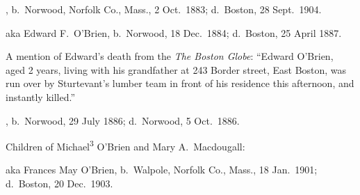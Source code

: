 \begin{Kids}
	
	, b.\ Norwood, Norfolk Co., Mass., 2 Oct.\ 1883;\cite{Arthur4OBrienBirth} d.\ Boston, 28 Sept.\ 1904.\cite{Arthur4OBrienDeath}
	
	 aka Edward F.\ O'Brien, b.\ Norwood, 18 Dec.\ 1884;\cite{Edward4OBrien2Birth} d.\ Boston, 25 April 1887.\cite{Edward4OBrien2Death}
	
	\begin{KidsMoreText}
		A mention of Edward's death from the \textit{The Boston Globe}: ``Edward O'Brien, aged 2 years, living with his grandfather at 243 Border street, East Boston, was run over by Sturtevant's lumber team in front of his residence this afternoon, and instantly killed.''\cite{Edward4OBrien2Death2}
	\end{KidsMoreText}
	
	, b.\ Norwood, 29 July 1886;\cite{Elizabeth4OBrienBirth} d.\ Norwood, 5 Oct.\ 1886.\cite{Elizabeth4OBrienDeath}
	
\end{Kids}

\begin{KidsIntro}
	Children of Michael\textsuperscript{3} O'Brien and Mary A.\ Macdougall:
\end{KidsIntro}

\begin{Kids}
	 aka Frances May O'Brien, b.\ Walpole, Norfolk Co., Mass., 18 Jan.\ 1901;\cite{Frances4OBrienBirth} d.\ Boston, 20 Dec.\ 1903.\cite{Frances4OBrienDeath}
\end{Kids}